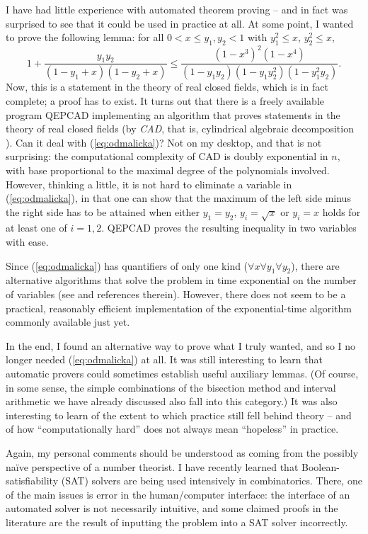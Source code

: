 I have had little experience with automated theorem proving -- and in fact
was surprised to see that it could be used in practice at all. At some point,
I wanted to prove the following lemma: 
 for all  $0<x\leq y_1,y_2<1$ with $y_1^2\leq x$, $y_2^2\leq x$,
\begin{equation}\label{eq:odmalicka}
1 + \frac{y_1 y_2}{(1-y_1+x) (1-y_2+x)} \leq
 \frac{(1-x^3)^2 (1-x^4)}{(1- y_1 y_2) (1 - y_1 y_2^2) (1 - y_1^2 y_2)} .
\end{equation}
Now, this is a statement in the theory of real closed fields, which is in fact
complete; a proof has to exist. It turns out that there is a freely available
program QEPCAD \cite{QEPCAD} implementing an algorithm that proves statements
in the theory of real closed fields (by {\em CAD}, that is,
cylindrical algebraic
  decomposition \cite{MR0403962}). Can it deal with (\ref{eq:odmalicka})?
Not on my desktop, and that is not surprising: the computational
complexity of CAD is doubly exponential in $n$, with base proportional
to the maximal degree of the polynomials involved. However,
thinking a little, it is not hard to eliminate a variable in
(\ref{eq:odmalicka}), in that one can show that the maximum of the
left side minus the right side has to be attained when either
$y_1 = y_2$, $y_i = \sqrt{x}$ or $y_i = x$ holds for at least one of $i=1,2$.
QEPCAD proves the resulting inequality in two variables with ease.

Since (\ref{eq:odmalicka}) has quantifiers of only one kind
($\forall x \forall y_1 \forall y_2$), there are alternative algorithms
that solve the problem in time exponential on the number of variables
(see \cite[Ch. 11]{opac-b1124307} and references therein).
However, there does not seem to be a practical, reasonably efficient
implementation of the exponential-time algorithm commonly available just yet.

In the end, I found an alternative way to prove what I truly wanted, and so
I no longer needed (\ref{eq:odmalicka}) at all. It was still interesting to
learn that automatic provers could sometimes establish useful auxiliary lemmas. (Of course, in some sense,
the simple combinations of the bisection method and interval arithmetic
we have already discussed also fall into this category.) It was also
interesting to learn of the extent to which
practice still fell behind theory -- and
of how ``computationally hard'' does not always mean ``hopeless'' in practice.

Again, my personal comments should be understood as coming from the possibly
na\"ive perspective of a number theorist. I have recently learned that
Boolean-satisfiability (SAT) solvers are being used intensively in
combinatorics. There, one of the main issues is error in the human/computer
interface: the interface of an automated solver is not necessarily
intuitive, and some claimed proofs in the literature are the result of
inputting the problem into a SAT solver incorrectly.

